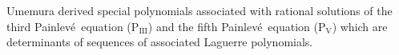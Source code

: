 \documentclass[10pt]{amsart}
\theoremstyle{definition}
\numberwithin{equation}{section}
\numberwithin{figure}{section}
\newcommand{\PIII}{$\mathrm{P}_{\mathrm{III}}$}
\newcommand{\PV}{$\mathrm{P}_{\mathrm{V}}$}
\newcommand{\comment}[1]{}
\newcommand{\p}{Painlev\'{e}}
\def\d{{\rm d}}
\newcommand{\deriv}[3][]{\frac{\d^{#1}{#2}}{{\d{#3}}^{#1}}}
\renewcommand{\a}{\alpha}
\newcommand{\VY}{Yablonskii--Vorob'ev polynomials}
\begin{document}
Umemura \cite{refUmemura01} derived special polynomials associated with rational solutions of the third \p\ equation (\PIII) and the fifth \p\ equation (\PV) 
\comment{\begin{align}\label{eq:P3}
u''&=\frac{(u')^2}{u} - \frac{u'}{z}
+\frac{\a u^2+\beta}{z}+\gamma u^3+\frac{\delta}{u},\\
\label{eq:P5}
u''&=\left(\frac{1}{2u}+\frac{1}{u-1}\right)(u')^2 - \frac{u'}{z} + \frac{(u-1)^2}{z^2}\left(\a u+\frac{\beta}{u}\right) +
\frac{\gamma u}{z}+\frac{\delta u(u+1)}{u-1},
\end{align}
with $\a$, $\beta$, $\gamma$ and $\delta$ constants,}%
which are determinants of sequences of associated Laguerre polynomials. %
\end{document}

